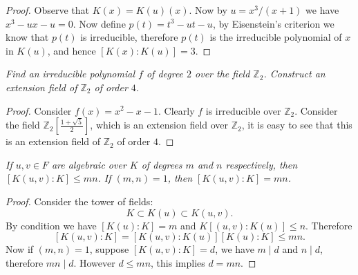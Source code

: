 \begin{proof}
Observe that $K(x)=K(u)(x)$. Now by $u=x^3/(x+1)$ we have $x^3-ux-u=0$. Now define $p(t)=t^3-ut-u$, by Eisenstein's criterion we know that $p(t)$ is irreducible, therefore $p(t)$ is the irreducible polynomial of $x$ in $K(u)$, and hence $[K(x):K(u)]=3$.
\end{proof}
\begin{problem}\em
Find an irreducible polynomial $f$ of degree $2$ over the field $\mathbb{Z}_2$. Construct an extension field of $\mathbb{Z}_2$ of order $4$.
\end{problem}
\begin{proof}
Consider $f(x)=x^2-x-1$. Clearly $f$ is irreducible over $\mathbb{Z}_2$. Consider the field $\mathbb{Z}_2\left[\frac{1+\sqrt{5}}{2}\right]$, which is an extension field over $\mathbb{Z}_2$, it is easy to see that this is an extension field of $\mathbb{Z}_2$ of order $4$.
\end{proof}
\begin{problem}\em
If $u,v\in F$ are algebraic over $K$ of degrees $m$ and $n$ respectively, then $[K(u,v):K]\le mn$. If $(m,n)=1$, then $[K(u,v):K]=mn$.
\end{problem}
\begin{proof}
Consider the tower of fields: 
$$
K\subset K\left( u \right) \subset K\left( u,v \right) .
$$
By condition we have $[K(u):K]=m$ and $K[(u,v):K(u)]\le n$. Therefore 
$$
\left[ K\left( u,v \right) :K \right] =\left[ K\left( u,v \right) :K\left( u \right) \right] \left[ K\left( u \right) :K \right] \le mn.
$$
Now if $(m,n)=1$, suppose $[K(u,v):K]=d$, we have $m\mid d$ and $n\mid d$, therefore $mn\mid d$. However $d\le mn$, this implies $d=mn$.
\end{proof}
